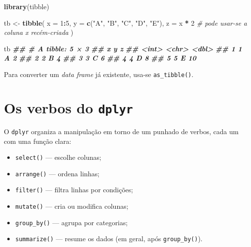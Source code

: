 \documentclass[
  portuguese,
  11pt,
  openany]{book}
\newenvironment{Shaded}{\begin{snugshade}}{\end{snugshade}}
\newcommand{\AttributeTok}[1]{\textcolor[rgb]{0.13,0.29,0.53}{#1}}
\newcommand{\CommentTok}[1]{\textcolor[rgb]{0.56,0.35,0.01}{\textit{#1}}}
\newcommand{\DecValTok}[1]{\textcolor[rgb]{0.00,0.00,0.81}{#1}}
\newcommand{\DocumentationTok}[1]{\textcolor[rgb]{0.56,0.35,0.01}{\textbf{\textit{#1}}}}
\newcommand{\FunctionTok}[1]{\textcolor[rgb]{0.13,0.29,0.53}{\textbf{#1}}}
\newcommand{\NormalTok}[1]{#1}
\newcommand{\OtherTok}[1]{\textcolor[rgb]{0.56,0.35,0.01}{#1}}
\newcommand{\SpecialCharTok}[1]{\textcolor[rgb]{0.81,0.36,0.00}{\textbf{#1}}}
\newcommand{\StringTok}[1]{\textcolor[rgb]{0.31,0.60,0.02}{#1}}
\providecommand{\tightlist}{%
  \setlength{\itemsep}{0pt}\setlength{\parskip}{0pt}}
\begin{document}
\begin{Shaded}
\begin{Highlighting}[]
\FunctionTok{library}\NormalTok{(tibble)}

\NormalTok{tb }\OtherTok{\textless{}{-}} \FunctionTok{tibble}\NormalTok{(}
  \AttributeTok{x =} \DecValTok{1}\SpecialCharTok{:}\DecValTok{5}\NormalTok{,}
  \AttributeTok{y =} \FunctionTok{c}\NormalTok{(}\StringTok{"A"}\NormalTok{, }\StringTok{"B"}\NormalTok{, }\StringTok{"C"}\NormalTok{, }\StringTok{"D"}\NormalTok{, }\StringTok{"E"}\NormalTok{),}
  \AttributeTok{z =}\NormalTok{ x }\SpecialCharTok{*} \DecValTok{2}                       \CommentTok{\# pode usar{-}se a coluna \textquotesingle{}x\textquotesingle{} recém{-}criada}
\NormalTok{)}

\NormalTok{tb}
\DocumentationTok{\#\# \# A tibble: 5 × 3}
\DocumentationTok{\#\#       x y         z}
\DocumentationTok{\#\#   \textless{}int\textgreater{} \textless{}chr\textgreater{} \textless{}dbl\textgreater{}}
\DocumentationTok{\#\# 1     1 A         2}
\DocumentationTok{\#\# 2     2 B         4}
\DocumentationTok{\#\# 3     3 C         6}
\DocumentationTok{\#\# 4     4 D         8}
\DocumentationTok{\#\# 5     5 E        10}
\end{Highlighting}
\end{Shaded}

Para converter um \emph{data frame} já existente, usa-se \texttt{as\_tibble()}.

\section{\texorpdfstring{Os verbos do \texttt{dplyr}}{Os verbos do dplyr}}\label{os-verbos-do-dplyr}

O \texttt{dplyr} organiza a manipulação em torno de um punhado de verbos, cada um com uma
função clara:

\begin{itemize}
\tightlist
\item
  \texttt{select()} --- escolhe colunas;
\item
  \texttt{arrange()} --- ordena linhas;
\item
  \texttt{filter()} --- filtra linhas por condições;
\item
  \texttt{mutate()} --- cria ou modifica colunas;
\item
  \texttt{group\_by()} --- agrupa por categorias;
\item
  \texttt{summarize()} --- resume os dados (em geral, após \texttt{group\_by()}).
\end{itemize}
\end{document}
